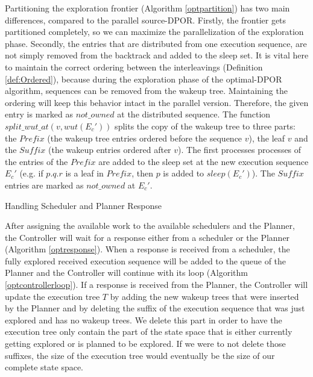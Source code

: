 Partitioning the exploration frontier (Algorithm \ref{optpartition}) has two main differences, compared to the parallel source-DPOR.
Firstly, the frontier gets partitioned completely, so we can maximize the parallelization of the exploration phase. 
Secondly, the entries that are distributed from one execution sequence, are not simply removed from the backtrack and added to
the sleep set. It is vital here to maintain the correct ordering between the interleavings (Definition \ref{def:Ordered}), because during the exploration phase of the optimal-DPOR algorithm, sequences can be removed
from the wakeup tree. Maintaining the ordering will keep this behavior intact in the parallel version. Therefore,
the given entry is marked as $not\_owned$ at the distributed sequence. The function  $split\_wut\_at(v, wut(E_c'))$
splits the copy of the wakeup tree to three parts: the $Prefix$ (the wakeup tree entries ordered before the sequence $v$), the leaf $v$
and the $Suffix$ (the wakeup entries ordered after $v$). The first processes processes of the entries of
the $Prefix$ are added to the sleep set at the new execution sequence $E_c'$ (e.g. if $p.q.r$ is a leaf in $Prefix$, then $p$ is added to
$sleep(E_c')$). The $Suffix$ entries are marked as $not\_owned$ at $E_c'$.

\begin{algorithm}
    \caption{Handling Scheduler and Planner Response}
    \label{optresponse}
\end{algorithm}

After assigning the available work to the available schedulers and the Planner, the Controller will wait for a response
either from a scheduler or the Planner (Algorithm \ref{optresponse}). When a response is received from a scheduler,
the fully explored received execution sequence will be added to the queue of the Planner and the Controller will continue
with its loop (Algorithm \ref{optcontrollerloop}). If a response is received from the Planner, the Controller will update
the execution tree $T$ by adding the new wakeup trees that were inserted by the Planner and by deleting the suffix of
the execution sequence that was just explored and has no wakeup trees. We delete this part in order to have the 
execution tree only contain the part of the state space that is either currently getting explored or is planned to be explored.
If we were to not delete those suffixes, the size of the execution tree would eventually be the size of our complete state space.

